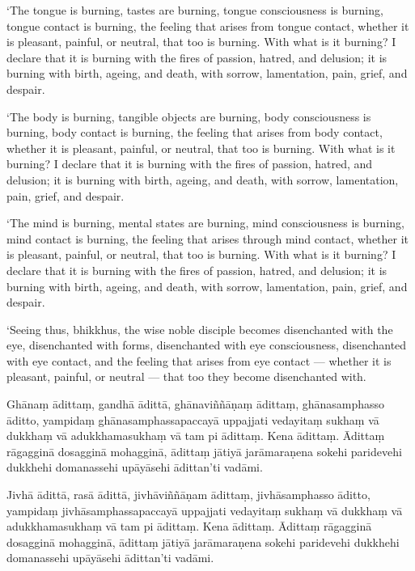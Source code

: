 ‘The tongue is burning, tastes are burning, tongue consciousness is
burning, tongue contact is burning, the feeling that arises from tongue
contact, whether it is pleasant, painful, or neutral, that too is
burning. With what is it burning? I declare that it is burning with the
fires of passion, hatred, and delusion; it is burning with birth,
ageing, and death, with sorrow, lamentation, pain, grief, and despair.

‘The body is burning, tangible objects are burning, body consciousness
is burning, body contact is burning, the feeling that arises from body
contact, whether it is pleasant, painful, or neutral, that too is
burning. With what is it burning? I declare that it is burning with the
fires of passion, hatred, and delusion; it is burning with birth,
ageing, and death, with sorrow, lamentation, pain, grief, and despair.

‘The mind is burning, mental states are burning, mind consciousness is
burning, mind contact is burning, the feeling that arises through mind
contact, whether it is pleasant, painful, or neutral, that too is
burning. With what is it burning? I declare that it is burning with the
fires of passion, hatred, and delusion; it is burning with birth,
ageing, and death, with sorrow, lamentation, pain, grief, and despair.

‘Seeing thus, bhikkhus, the wise noble disciple becomes disenchanted
with the eye, disenchanted with forms, disenchanted with eye
consciousness, disenchanted with eye contact, and the feeling that
arises from eye contact --- whether it is pleasant, painful, or
neutral --- that too they become disenchanted with.

\clearpage

\paliText
\markboth{\paliTitle}{\rightmark}

Ghānaṃ ādittaṃ, gandhā ādittā, ghānaviññāṇaṃ ādittaṃ, ghānasamphasso
āditto, yampidaṃ ghānasamphassapaccayā uppajjati vedayitaṃ sukhaṃ vā
dukkhaṃ vā adukkhamasukhaṃ vā tam pi ādittaṃ. Kena ādittaṃ. Ādittaṃ
rāgagginā dosagginā mohagginā, ādittaṃ jātiyā jarāmaraṇena sokehi
paridevehi dukkhehi domanassehi upāyāsehi ādittan'ti vadāmi.

Jivhā ādittā, rasā ādittā, jivhāviññāṇam ādittaṃ, jivhāsamphasso āditto,
yampidaṃ jivhāsamphassapaccayā uppajjati vedayitaṃ sukhaṃ vā dukkhaṃ vā
adukkhamasukhaṃ vā tam pi ādittaṃ. Kena ādittaṃ. Ādittaṃ rāgagginā
dosagginā mohagginā, ādittaṃ jātiyā jarāmaraṇena sokehi paridevehi
dukkhehi domanassehi upāyāsehi ādittan'ti vadāmi.

